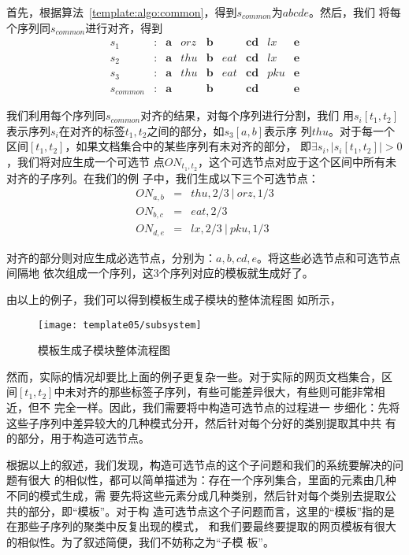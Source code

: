 首先，根据算法~\ref{template:algo:common}，得到$s_{common}$为$abcde$。然后，我们
将每个序列同$s_{common}$进行对齐，得到
\[
\begin{matrix}
s_1      &:&\mathbf{a}&orz&\mathbf{b}&   &\mathbf{cd}&lx&\mathbf{e}\\
s_2      &:&\mathbf{a}&thu&\mathbf{b}&eat&\mathbf{cd}&lx&\mathbf{e}\\
s_3      &:&\mathbf{a}&thu&\mathbf{b}&eat&\mathbf{cd}&pku&\mathbf{e}\\
s_{common}&:&\mathbf{a}&   &\mathbf{b}&   &\mathbf{cd}&   &\mathbf{e}
\end{matrix}
\]

我们利用每个序列同$s_{common}$对齐的结果，对每个序列进行分割，我们
用$s_i[t_1,t_2]$表示序列$s_i$在对齐的标签$t_1,t_2$之间的部分，如$s_3[a,b]$表示序
列$thu$。对于每一个区间$[t_1,t_2]$，如果文档集合中的某些序列有未对齐的部分，
即$\exists s_i,|s_i[t_1,t_2]| > 0$，我们将对应生成一个可选节
点$ON_{t_1,t_2}$，这个可选节点对应于这个区间中所有未对齐的子序列。在我们的例
子中，我们生成以下三个可选节点：
\begin{eqnarray*}
  ON_{a,b}&=&thu,2/3~|~orz,1/3\\
  ON_{b,c}&=&eat,2/3\\
  ON_{d,e}&=&lx,2/3~|~pku,1/3
\end{eqnarray*}

对齐的部分则对应生成必选节点，分别为：$a,b,cd,e$。将这些必选节点和可选节点间隔地
依次组成一个序列，这3个序列对应的模板就生成好了。

由以上的例子，我们可以得到模板生成子模块的整体流程图
如所示，
\begin{figure}
  \centering
  \texttt{[image: template05/subsystem]}
  \caption{模板生成子模块整体流程图}
  \label{template:fig:subsystem}
\end{figure}

然而，实际的情况却要比上面的例子更复杂一些。对于实际的网页文档集合，区
间$[t_1,t_2]$中未对齐的那些标签子序列，有些可能差异很大，有些则可能非常相近，但不
完全一样。因此，我们需要将中构造可选节点的过程进一
步细化：先将这些子序列中差异较大的几种模式分开，然后针对每个分好的类别提取其中共
有的部分，用于构造可选节点。

根据以上的叙述，我们发现，构造可选节点的这个子问题和我们的系统要解决的问题有很大
的相似性，都可以简单描述为：存在一个序列集合，里面的元素由几种不同的模式生成，需
要先将这些元素分成几种类别，然后针对每个类别去提取公共的部分，即“模板”。对于构
造可选节点这个子问题而言，这里的“模板”指的是在那些子序列的聚类中反复出现的模式，
和我们要最终要提取的网页模板有很大的相似性。为了叙述简便，我们不妨称之为“子模
板”。

